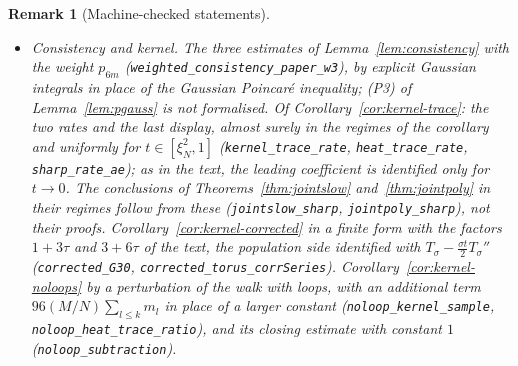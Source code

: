 \documentclass[11pt,a4paper]{article}
\theoremstyle{stmt}
\theoremstyle{defn}
\theoremstyle{rmk}
\newtheorem{remark}[theorem]{Remark}
\numberwithin{equation}{section}
\DeclareMathOperator{\Tr}{Tr}
\begin{document}
{\begin{remark}[Machine-checked statements]
\begin{itemize}
statistic and a remainder of the same form (\texttt{variance\_two\_general}, \texttt{variance\_two\_sqrt}; written by a sub-task with a different model, checked by Lean, the statements not yet read by anyone); the constants of the remainder are of degree $20$ in $m_1$ and are not evaluated. For general $k$ only that the first-order term of the Hoeffding decomposition of $\Tr P^k$ vanishes (\texttt{trace\_pow\_first\_order}), and the exact variance of $\Tr\tilde P^2$ (\texttt{var\_trace\_two}).
\item \emph{Consistency and kernel.} The three estimates of Lemma~\ref{lem:consistency} with the weight $p_{6m}$ (\texttt{weighted\_consistency\_paper\_w3}), by explicit Gaussian integrals in place of the Gaussian Poincar\'e inequality; (P3) of Lemma~\ref{lem:pgauss} is not formalised. Of Corollary~\ref{cor:kernel-trace}: the two rates and the last display, almost surely in the regimes of the corollary and uniformly for $t\in[\xi_N^2,1]$ (\texttt{kernel\_trace\_rate}, \texttt{heat\_trace\_rate}, \texttt{sharp\_rate\_ae}); as in the text, the leading coefficient is identified only for $t\to0$. The conclusions of Theorems~\ref{thm:jointslow} and~\ref{thm:jointpoly} in their regimes follow from these (\texttt{jointslow\_sharp}, \texttt{jointpoly\_sharp}), not their proofs. Corollary~\ref{cor:kernel-corrected} in a finite form with the factors $1+3\tau$ and $3+6\tau$ of the text, the population side identified with $T_\sigma-\frac{\sigma t}2T_\sigma''$ (\texttt{corrected\_G30}, \texttt{corrected\_torus\_corrSeries}). Corollary~\ref{cor:kernel-noloops} by a perturbation of the walk with loops, with an additional term $96(M/N)\sum_{l\le k}m_l$ in place of a larger constant (\texttt{noloop\_kernel\_sample}, \texttt{noloop\_heat\_trace\_ratio}), and its closing estimate with constant $1$ (\texttt{noloop\_subtraction}).

\end{itemize}
\end{remark}}
\end{document}
